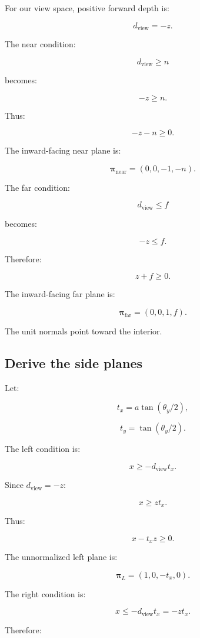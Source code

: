 For our view space, positive forward depth is:

\[
 d_{\mathrm{view}}=-z.
\]

The near condition:

\[
 d_{\mathrm{view}}\ge n
\]

becomes:

\[
 -z\ge n.
\]

Thus:

\[
 \boxed{ -z-n\ge0 }.
\]

The inward-facing near plane is:

\[
 \boxed{ \boldsymbol\pi_{\mathrm{near}}=(0,0,-1,-n) }.
\]

The far condition:

\[
 d_{\mathrm{view}}\le f
\]

becomes:

\[
 -z\le f.
\]

Therefore:

\[
 \boxed{ z+f\ge0 }.
\]

The inward-facing far plane is:

\[
 \boxed{ \boldsymbol\pi_{\mathrm{far}}=(0,0,1,f) }.
\]

The unit normals point toward the interior.

\subsection{Derive the side planes}\label{02-foundations-ii-ch034-derive-the-side-planes}

\hypertarget{02-foundations-ii-ch034-derive-the-side-planes}{}

Let:

\[
 t_x=a\tan(\theta_y/2),
\]

\[
 t_y=\tan(\theta_y/2).
\]

The left condition is:

\[
 x\ge-d_{\mathrm{view}}t_x.
\]

Since \(d_{\mathrm{view}}=-z\):

\[
 x\ge zt_x.
\]

Thus:

\[
 \boxed{x-t_xz\ge0}.
\]

The unnormalized left plane is:

\[
 \boxed{ \boldsymbol\pi_L=(1,0,-t_x,0) }.
\]

The right condition is:

\[
 x\le-d_{\mathrm{view}}t_x=-zt_x.
\]

Therefore:

